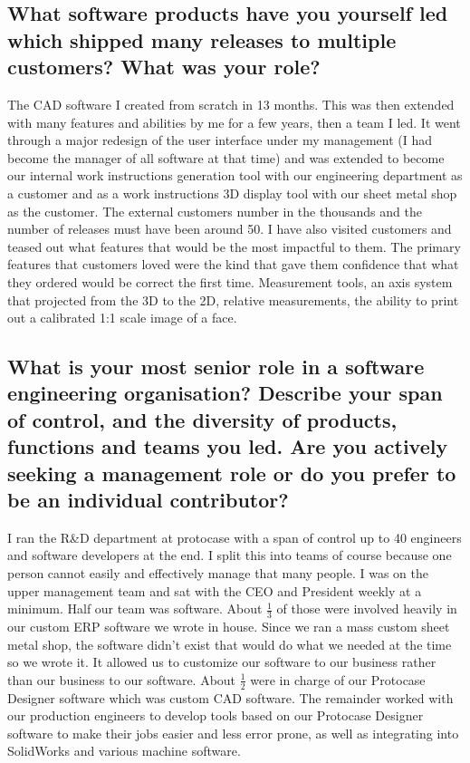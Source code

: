 \documentclass[letter,12pt]{article}
\begin{document}
\subsection{What software products have you yourself led which shipped many releases to multiple customers? What was your role?}
The CAD software I created from scratch in 13 months. This was then extended with many features and abilities by me for a few years, then a team I led. It went through a major redesign of the user interface under my management (I had become the manager of all software at that time) and was extended to become our internal work instructions generation tool with our engineering department as a customer and as a work instructions 3D display tool with our sheet metal shop as the customer. The external customers number in the thousands and the number of releases must have been around 50. I have also visited customers and teased out what features that would be the most impactful to them. The primary features that customers loved were the kind that gave them confidence that what they ordered would be correct the first time. Measurement tools, an axis system that projected from the 3D to the 2D, relative measurements, the ability to print out a calibrated 1:1 scale image of a face.

\subsection{What is your most senior role in a software engineering organisation? Describe your span of control, and the diversity of products, functions and teams you led. Are you actively seeking a management role or do you prefer to be an individual contributor?}
I ran the R\&D department at protocase with a span of control up to 40 engineers and software developers at the end. I split this into teams of course because one person cannot easily and effectively manage that many people. I was on the upper management team and sat with the CEO and President weekly at a minimum. Half our team was software. About $\frac{1}{3}$ of those were involved heavily in our custom ERP software we wrote in house. Since we ran a mass custom sheet metal shop, the software didn't exist that would do what we needed at the time so we wrote it. It allowed us to customize our software to our business rather than our business to our software. About $\frac{1}{2}$ were in charge of our Protocase Designer software which was custom CAD software. The remainder worked with our production engineers to develop tools based on our Protocase Designer software to make their jobs easier and less error prone, as well as integrating into SolidWorks and various machine software.
\end{document}
